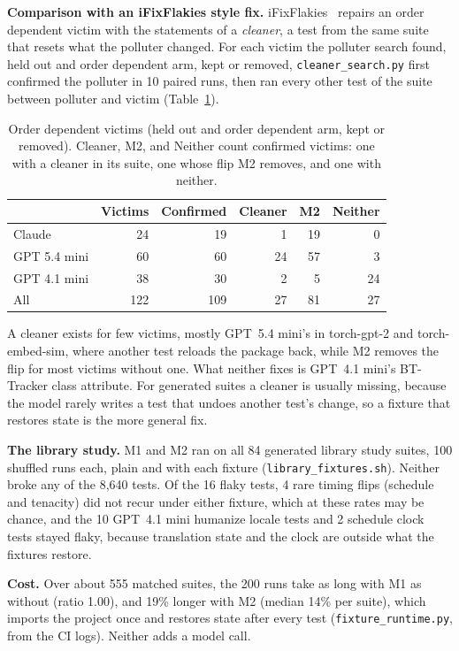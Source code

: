 \textbf{Comparison with an iFixFlakies style fix.} iFixFlakies~\cite{shi2019} repairs an order dependent victim with the statements of a \emph{cleaner}, a test from the same suite that resets what the polluter changed. For each victim the polluter search found, held out and order dependent arm, kept or removed, \texttt{cleaner\_search.py} first confirmed the polluter in 10 paired runs, then ran every other test of the suite between polluter and victim (Table~\ref{tab:cleaners}).

\begin{table}[htbp]
\caption{Order dependent victims (held out and order dependent arm, kept or removed). Cleaner, M2, and Neither count confirmed victims: one with a cleaner in its suite, one whose flip M2 removes, and one with neither.}
\label{tab:cleaners}
\small
\setlength{\tabcolsep}{3pt}
\begin{tabular}{lrrrrr}
\toprule
 & Victims & Confirmed & Cleaner & M2 & Neither \\
\midrule
Claude & 24 & 19 & 1 & 19 & 0 \\
GPT 5.4 mini & 60 & 60 & 24 & 57 & 3 \\
GPT 4.1 mini & 38 & 30 & 2 & 5 & 24 \\
\midrule
All & 122 & 109 & 27 & 81 & 27 \\
\bottomrule
\end{tabular}
\end{table}

A cleaner exists for few victims, mostly GPT~5.4 mini's in torch-gpt-2 and torch-embed-sim, where another test reloads the package back, while M2 removes the flip for most victims without one. What neither fixes is GPT~4.1 mini's BT-Tracker class attribute. For generated suites a cleaner is usually missing, because the model rarely writes a test that undoes another test's change, so a fixture that restores state is the more general fix.

\textbf{The library study.} M1 and M2 ran on all 84 generated library study suites, 100 shuffled runs each, plain and with each fixture (\texttt{library\_fixtures.sh}). Neither broke any of the 8,640 tests. Of the 16 flaky tests, 4 rare timing flips (schedule and tenacity) did not recur under either fixture, which at these rates may be chance, and the 10 GPT~4.1 mini humanize locale tests and 2 schedule clock tests stayed flaky, because translation state and the clock are outside what the fixtures restore.

\textbf{Cost.} Over about 555 matched suites, the 200 runs take as long with M1 as without (ratio 1.00), and 19\% longer with M2 (median 14\% per suite), which imports the project once and restores state after every test (\texttt{fixture\_runtime.py}, from the CI logs). Neither adds a model call.

